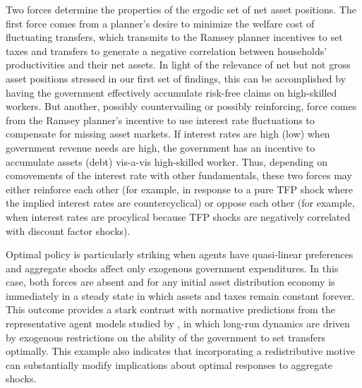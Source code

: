 \documentclass[thmsb,11pt]{article}
\begin{document}
Two forces  determine the properties of the ergodic set of net asset positions. The first force comes from a planner's desire to minimize the welfare cost of fluctuating transfers, which transmits to the Ramsey planner incentives to set taxes and transfers to generate a negative correlation between households' productivities and their
net assets. In light of  the relevance  of net but not gross asset positions stressed in
our first set of findings, this  can be accomplished by having the  government  effectively accumulate risk-free claims on high-skilled workers.
But another, possibly countervailing or possibly reinforcing,  force  comes from the Ramsey planner's incentive to  use  interest rate fluctuations  to compensate for missing asset markets. If interest rates are high (low) when government revenue needs are high, the government has an incentive to accumulate assets (debt) vis-a-vis high-skilled worker. Thus, depending on  comovements of the interest rate with other fundamentals, these two forces  may either reinforce each other (for example, in response to  a pure TFP shock where the implied interest rates are countercyclical) or oppose each other (for example, when  interest rates are procylical because TFP shocks are negatively correlated with discount factor shocks).

Optimal policy is particularly striking when agents have quasi-linear preferences and aggregate shocks affect only exogenous government expenditures. In this case, both  forces are absent and for any initial asset distribution economy is immediately in a steady state in which assets and taxes remain constant forever. This outcome provides a stark contrast with normative predictions from the representative agent models studied by \citet{Aiyagari2002}, in which  long-run dynamics are driven by exogenous restrictions on the ability of the government to set transfers optimally. This example also indicates that incorporating a redistributive motive can  substantially modify implications about  optimal responses to  aggregate shocks.
\end{document}
